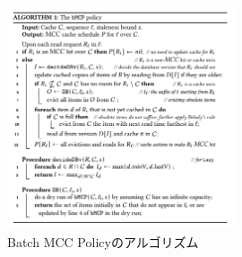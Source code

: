 \documentclass[dvipdfmx,uplatex]{jsarticle}
\theoremstyle{remark}
\begin{document}
\begin{figure}
    \centering
    \includegraphics[width=0.6\textwidth]{img/cache-consistent/batch.png}
    \caption{Batch MCC Policyのアルゴリズム}
    \label{fig:batch-algorithm}
\end{figure}
\end{document}
